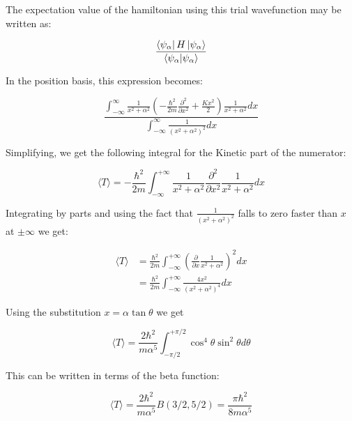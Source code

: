 \question
{}

The expectation value of the hamiltonian using this trial wavefunction may be written as:

\begin{equation}
    \frac{\bra{\psi_\alpha} H \ket{\psi_\alpha}}{\braket{\psi_\alpha}{\psi_\alpha}}
\end{equation}

In the position basis, this expression becomes:

\begin{equation}
\frac{
    \int_{-\infty}^{\infty} \frac{1}{x^2 + \alpha^2} (-\frac{\hbar^2}{2m} \frac{\partial^2 }{\partial x^2} + \frac{K x^2}{2}) \frac{1}{x^2 + \alpha^2} dx
}
{\int_{-\infty}^{\infty}  \frac{1}{(x^2 + \alpha^2)^2} dx} 
\end{equation}

Simplifying, we get the following integral for the Kinetic part of the numerator:

\begin{equation}
   \langle T \rangle = -\frac{\hbar^2}{2m}  \int_{-\infty}^{+\infty} \frac{1}{x^2 + \alpha^2} \frac{\partial^2 }{\partial x^2}  \frac{1}{x^2 + \alpha^2} dx
\end{equation}

Integrating by parts and using the fact that $\frac{1}{(x^2 + \alpha^2)^2}$ falls to zero faster than $x$ at $\pm \infty$ we get:

\begin{equation}
\begin{split}
   \langle T \rangle &= \frac{\hbar^2}{2m}  \int_{-\infty}^{+\infty}  (\frac{\partial }{\partial x}  \frac{1}{x^2 + \alpha^2})^2 dx \\
   &=  \frac{\hbar^2}{2m}  \int_{-\infty}^{+\infty}   \frac{4x^2}{(x^2 + \alpha^2)^4} dx
\end{split}
\end{equation}

Using the substitution $x = \alpha \tan \theta$ we get

\begin{equation}
     \langle T \rangle = \frac{2 \hbar^2}{m \alpha^5}  \int_{-\pi/2}^{+\pi/2} \cos^4 \theta \sin^2 \theta d \theta
\end{equation}

This can be written in terms of the beta function:

\begin{equation}
 \langle T \rangle = \frac{2 \hbar^2}{m \alpha^5} B(3/2 , 5/2) = \frac{\pi \hbar^2}{8 m \alpha^5}
\end{equation}

